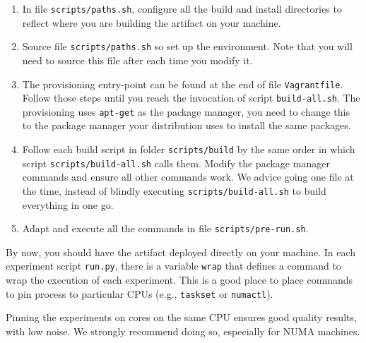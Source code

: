 \documentclass[12pt]{article}
\newcommand{\host}[1]{\colorbox{blue!20}{\texttt{\color{black}#1}}}
\begin{document}
\begin{enumerate}

    \item In file \host{scripts/paths.sh}, configure all the build and install
        directories to reflect where you are building the artifact on your
        machine.

    \item Source file \host{scripts/paths.sh} so set up the environment.  Note
        that you will need to source this file after each time you modify it.

    \item The provisioning entry-point can be found at the end of file
        \host{Vagrantfile}.  Follow those steps until you reach the invocation
        of script \texttt{build-all.sh}. The provisioning uses \texttt{apt-get}
        as the package manager, you need to change this to the package manager
        your distribution uses to install the same packages.

    \item Follow each build script in folder \host{scripts/build} by the same
        order in which script \host{scripts/build-all.sh} calls them.  Modify
        the package manager commands and ensure all other commands work.  We
        advice going one file at the time, instead of blindly executing
        \host{scripts/build-all.sh} to build everything in one go.

    \item Adapt and execute all the commands in file
        \host{scripts/pre-run.sh}.

\end{enumerate}

By now, you should have the artifact deployed directly on your machine.  In each
experiment script \texttt{run.py}, there is a variable \texttt{wrap} that
defines a command to wrap the execution of each experiment.  This is a good
place to place commands to pin process to particular CPUs (e.g.,
\texttt{taskset} or \texttt{numactl}).

Pinning the experiments on cores on the same CPU ensures good quality results,
with low noise.  We strongly recommend doing so, especially for NUMA machines.
\end{document}
